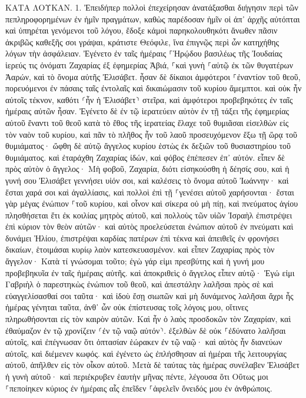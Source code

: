 \documentclass[twoside, 9pt]{extreport}
\begin{document}
ΚΑΤΑ ΛΟΥΚΑΝ.
1.
Ἐπειδήπερ πολλοὶ ἐπεχείρησαν ἀνατάξασθαι διήγησιν περὶ τῶν πεπληροφορημένων ἐν ἡμῖν πραγμάτων, 
καθὼς παρέδοσαν ἡμῖν οἱ ἀπ᾽ ἀρχῆς αὐτόπται καὶ ὑπηρέται γενόμενοι τοῦ λόγου, 
ἔδοξε κἀμοὶ παρηκολουθηκότι ἄνωθεν πᾶσιν ἀκριβῶς καθεξῆς σοι γράψαι, κράτιστε Θεόφιλε, 
ἵνα ἐπιγνῷς περὶ ὧν κατηχήθης λόγων τὴν ἀσφάλειαν. 
Ἐγένετο ἐν ταῖς ἡμέραις ⸀Ἡρῴδου βασιλέως τῆς Ἰουδαίας ἱερεύς τις ὀνόματι Ζαχαρίας ἐξ ἐφημερίας Ἀβιά, ⸀καὶ γυνὴ ⸀αὐτῷ ἐκ τῶν θυγατέρων Ἀαρών, καὶ τὸ ὄνομα αὐτῆς Ἐλισάβετ. 
ἦσαν δὲ δίκαιοι ἀμφότεροι ⸀ἐναντίον τοῦ θεοῦ, πορευόμενοι ἐν πάσαις ταῖς ἐντολαῖς καὶ δικαιώμασιν τοῦ κυρίου ἄμεμπτοι. 
καὶ οὐκ ἦν αὐτοῖς τέκνον, καθότι ⸂ἦν ἡ Ἐλισάβετ⸃ στεῖρα, καὶ ἀμφότεροι προβεβηκότες ἐν ταῖς ἡμέραις αὐτῶν ἦσαν. 
Ἐγένετο δὲ ἐν τῷ ἱερατεύειν αὐτὸν ἐν τῇ τάξει τῆς ἐφημερίας αὐτοῦ ἔναντι τοῦ θεοῦ 
κατὰ τὸ ἔθος τῆς ἱερατείας ἔλαχε τοῦ θυμιᾶσαι εἰσελθὼν εἰς τὸν ναὸν τοῦ κυρίου, 
καὶ πᾶν τὸ πλῆθος ἦν τοῦ λαοῦ προσευχόμενον ἔξω τῇ ὥρᾳ τοῦ θυμιάματος· 
ὤφθη δὲ αὐτῷ ἄγγελος κυρίου ἑστὼς ἐκ δεξιῶν τοῦ θυσιαστηρίου τοῦ θυμιάματος. 
καὶ ἐταράχθη Ζαχαρίας ἰδών, καὶ φόβος ἐπέπεσεν ἐπ᾽ αὐτόν. 
εἶπεν δὲ πρὸς αὐτὸν ὁ ἄγγελος· Μὴ φοβοῦ, Ζαχαρία, διότι εἰσηκούσθη ἡ δέησίς σου, καὶ ἡ γυνή σου Ἐλισάβετ γεννήσει υἱόν σοι, καὶ καλέσεις τὸ ὄνομα αὐτοῦ Ἰωάννην· 
καὶ ἔσται χαρά σοι καὶ ἀγαλλίασις, καὶ πολλοὶ ἐπὶ τῇ ⸀γενέσει αὐτοῦ χαρήσονται· 
ἔσται γὰρ μέγας ἐνώπιον ⸀τοῦ κυρίου, καὶ οἶνον καὶ σίκερα οὐ μὴ πίῃ, καὶ πνεύματος ἁγίου πλησθήσεται ἔτι ἐκ κοιλίας μητρὸς αὐτοῦ, 
καὶ πολλοὺς τῶν υἱῶν Ἰσραὴλ ἐπιστρέψει ἐπὶ κύριον τὸν θεὸν αὐτῶν· 
καὶ αὐτὸς προελεύσεται ἐνώπιον αὐτοῦ ἐν πνεύματι καὶ δυνάμει Ἠλίου, ἐπιστρέψαι καρδίας πατέρων ἐπὶ τέκνα καὶ ἀπειθεῖς ἐν φρονήσει δικαίων, ἑτοιμάσαι κυρίῳ λαὸν κατεσκευασμένον. 
καὶ εἶπεν Ζαχαρίας πρὸς τὸν ἄγγελον· Κατὰ τί γνώσομαι τοῦτο; ἐγὼ γάρ εἰμι πρεσβύτης καὶ ἡ γυνή μου προβεβηκυῖα ἐν ταῖς ἡμέραις αὐτῆς. 
καὶ ἀποκριθεὶς ὁ ἄγγελος εἶπεν αὐτῷ· Ἐγώ εἰμι Γαβριὴλ ὁ παρεστηκὼς ἐνώπιον τοῦ θεοῦ, καὶ ἀπεστάλην λαλῆσαι πρὸς σὲ καὶ εὐαγγελίσασθαί σοι ταῦτα· 
καὶ ἰδοὺ ἔσῃ σιωπῶν καὶ μὴ δυνάμενος λαλῆσαι ἄχρι ἧς ἡμέρας γένηται ταῦτα, ἀνθ᾽ ὧν οὐκ ἐπίστευσας τοῖς λόγοις μου, οἵτινες πληρωθήσονται εἰς τὸν καιρὸν αὐτῶν. 
Καὶ ἦν ὁ λαὸς προσδοκῶν τὸν Ζαχαρίαν, καὶ ἐθαύμαζον ἐν τῷ χρονίζειν ⸂ἐν τῷ ναῷ αὐτόν⸃. 
ἐξελθὼν δὲ οὐκ ⸀ἐδύνατο λαλῆσαι αὐτοῖς, καὶ ἐπέγνωσαν ὅτι ὀπτασίαν ἑώρακεν ἐν τῷ ναῷ· καὶ αὐτὸς ἦν διανεύων αὐτοῖς, καὶ διέμενεν κωφός. 
καὶ ἐγένετο ὡς ἐπλήσθησαν αἱ ἡμέραι τῆς λειτουργίας αὐτοῦ, ἀπῆλθεν εἰς τὸν οἶκον αὐτοῦ. 
Μετὰ δὲ ταύτας τὰς ἡμέρας συνέλαβεν Ἐλισάβετ ἡ γυνὴ αὐτοῦ· καὶ περιέκρυβεν ἑαυτὴν μῆνας πέντε, λέγουσα 
ὅτι Οὕτως μοι ⸀πεποίηκεν κύριος ἐν ἡμέραις αἷς ἐπεῖδεν ⸀ἀφελεῖν ὄνειδός μου ἐν ἀνθρώποις. 
\end{document}

